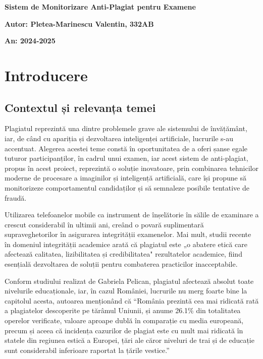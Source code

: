 \documentclass[12pt,a4paper]{article}
\begin{document}
\begin{titlepage}
    \centering
    \vspace*{\fill}
    {\huge\bfseries Sistem de Monitorizare Anti-Plagiat pentru Examene \par}
    \vspace*{\fill}
    \raggedright
    {\large\bfseries Autor: Pletea-Marinescu Valentin, 332AB \par}
    {\large\bfseries An: 2024-2025 \par}
\end{titlepage}

\tableofcontents
\newpage

\section{Introducere}

\subsection{Contextul și relevanța temei}

Plagiatul reprezintă una dintre problemele grave ale sistemului de
învățământ, iar, de când cu apariția și dezvoltarea inteligenței
artificiale, lucrurile s-au accentuat. Alegerea acestei teme constă în
oportunitatea de a oferi șanse egale tuturor participanților, în
cadrul unui examen, iar acest sistem de anti-plagiat, propus în acest
proiect, reprezintă o soluție inovatoare, prin combinarea tehnicilor
moderne de procesare a imaginilor și inteligență artificială\cite{academic2}, care își
propune să monitorizeze comportamentul candidaților și să semnaleze
posibile tentative de fraudă.

Utilizarea telefoanelor mobile ca instrument de înșelătorie în sălile de examinare a crescut
considerabil în ultimii ani, creând o povară suplimentară supraveghetorilor în asigurarea
integrității examenelor\cite{mobile_detection}. Mai mult, studii recente în domeniul integrității
academice arată că plagiatul este „o abatere etică care afectează calitatea, lizibilitatea și
credibilitatea" rezultatelor academice, fiind esențială dezvoltarea de soluții pentru combaterea
practicilor inacceptabile\cite{plagiarism_ethics}.

Conform studiului realizat de Gabriela Pelican\cite{pelican}, plagiatul
afectează absolut toate nivelurile educaționale, iar, în cazul
României, lucrurile nu merg foarte bine la capitolul acesta, autoarea
menționând că ``România prezintă cea mai ridicată rată a plagiatelor
descoperite pe tărâmul Uniunii, și anume 26.1\% din totalitatea
operelor verificate, valoare aproape dublă în comparație cu media
europeană, precum și aceea că incidența cazurilor de plagiat este cu
mult mai ridicată în statele din regiunea estică a Europei, țări ale
căror niveluri de trai și de educație sunt considerabil inferioare
raportat la țările vestice.''
\end{document}
